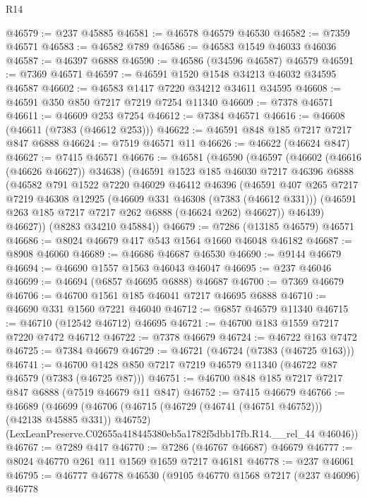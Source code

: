 \begin{lexlean}{R14}
\begin{coremodule}
@46579 := @237 @45885
@46581 := @46578 @46579 @46530
@46582 := @7359 @46571
@46583 := @46582 @789
@46586 := @46583 @1549 @46033 @46036
@46587 := @46397 @6888
@46590 := @46586 (@34596 @46587) @46579
@46591 := @7369 @46571
@46597 := @46591 @1520 @1548 @34213 @46032 @34595 @46587
@46602 := @46583 @1417 @7220 @34212 @34611 @34595
@46608 := @46591 @350 @850 @7217 @7219 @7254 @11340
@46609 := @7378 @46571
@46611 := @46609 @253 @7254
@46612 := @7384 @46571
@46616 := @46608 (@46611 (@7383 (@46612 @253)))
@46622 := @46591 @848 @185 @7217 @7217 @847 @6888
@46624 := @7519 @46571 @11
@46626 := @46622 (@46624 @847)
@46627 := @7415 @46571
@46676 := @46581
    (@46590
      (@46597
        (@46602 (@46616 (@46626 @46627)) @34638)
        (@46591
          @1523
          @185
          @46030
          @7217
          @46396
          @6888
          (@46582
            @791
            @1522
            @7220
            @46029
            @46412
            @46396
            (@46591
              @407
              @265
              @7217
              @7219
              @46308
              @12925
              (@46609 @331 @46308 (@7383 (@46612 @331)))
              (@46591 @263 @185 @7217 @7217 @262 @6888 (@46624 @262) @46627))
            @46439)
          @46627))
      (@8283 @34210 @45884))
@46679 := @7286 (@13185 @46579) @46571
@46686 := @8024 @46679 @417 @543 @1564 @1660 @46048 @46182
@46687 := @8908 @46060
@46689 := @46686 @46687 @46530
@46690 := @9144 @46679
@46694 := @46690 @1557 @1563 @46043 @46047
@46695 := @237 @46046
@46699 := @46694 (@6857 @46695 @6888) @46687
@46700 := @7369 @46679
@46706 := @46700 @1561 @185 @46041 @7217 @46695 @6888
@46710 := @46690 @331 @1560 @7221 @46040
@46712 := @6857 @46579 @11340
@46715 := @46710 (@12542 @46712) @46695
@46721 := @46700 @183 @1559 @7217 @7220 @7472 @46712
@46722 := @7378 @46679
@46724 := @46722 @163 @7472
@46725 := @7384 @46679
@46729 := @46721 (@46724 (@7383 (@46725 @163)))
@46741 := @46700 @1428 @850 @7217 @7219 @46579 @11340 (@46722 @87 @46579 (@7383 (@46725 @87)))
@46751 := @46700 @848 @185 @7217 @7217 @847 @6888 (@7519 @46679 @11 @847)
@46752 := @7415 @46679
@46766 := @46689
    (@46699
      (@46706 (@46715 (@46729 (@46741 (@46751 @46752))) (@42138 @45885 @331)) @46752)
      (LexLeanPreserve.C02655a418445380eb5a1782f5dbb17fb.R14.__rel_44 @46046))
@46767 := @7289 @417
@46770 := @7286 (@46767 @46687) @46679
@46777 := @8024 @46770 @261 @11 @1569 @1659 @7217 @46181
@46778 := @237 @46061
@46795 := @46777
    @46778
    @46530
    (@9105
      @46770
      @1568
      @7217
      (@237 @46096)
      @46778

\end{coremodule}
\end{lexlean}
